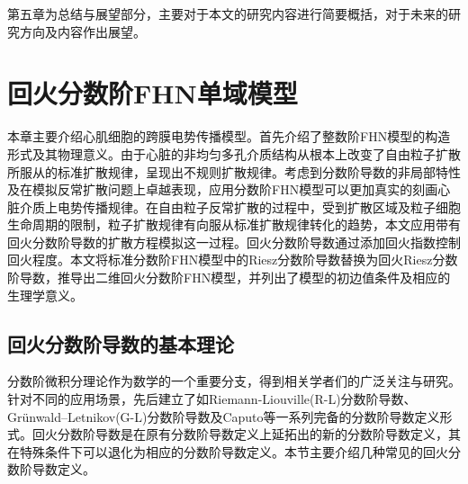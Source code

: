 \documentclass[twoside,UTF8]{nputhesis}
\begin{document}
第五章为总结与展望部分，主要对于本文的研究内容进行简要概括，对于未来的研究方向及内容作出展望。                            







\chapter{回火分数阶FHN单域模型}
本章主要介绍心肌细胞的跨膜电势传播模型。首先介绍了整数阶FHN模型的构造形式及其物理意义。由于心脏的非均匀多孔介质结构从根本上改变了自由粒子扩散所服从的标准扩散规律，呈现出不规则扩散规律。考虑到分数阶导数的非局部特性及在模拟反常扩散问题上卓越表现，应用分数阶FHN模型可以更加真实的刻画心脏介质上电势传播规律。在自由粒子反常扩散的过程中，受到扩散区域及粒子细胞生命周期的限制，粒子扩散规律有向服从标准扩散规律转化的趋势，本文应用带有回火分数阶导数的扩散方程模拟这一过程。回火分数阶导数通过添加回火指数控制回火程度。本文将标准分数阶FHN模型中的Riesz分数阶导数替换为回火Riesz分数阶导数，推导出二维回火分数阶FHN模型，并列出了模型的初边值条件及相应的生理学意义。

\section{回火分数阶导数的基本理论}

分数阶微积分理论作为数学的一个重要分支，得到相关学者们的广泛关注与研究。针对不同的应用场景，先后建立了如Riemann-Liouville(R-L)分数阶导数、Grünwald–Letnikov(G-L)分数阶导数及Caputo等一系列完备的分数阶导数定义形式。回火分数阶导数是在原有分数阶导数定义上延拓出的新的分数阶导数定义，其在特殊条件下可以退化为相应的分数阶导数定义。本节主要介绍几种常见的回火分数阶导数定义。
\end{document}
